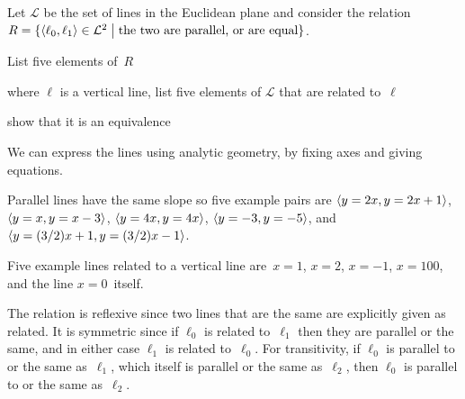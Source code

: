 \documentclass{ibl}  %
\begin{document}
\begin{problem}[\midlength] 
\label{PlaneLinesAsClasses}
Let $\mathcal{L}$ be the set of lines in the Euclidean plane and consider
the relation
$R=\{\langle\ell_0,\ell_1\rangle\in \mathcal{L}^2 \bigm| \text{the two are parallel, or are equal}\}$.
\begin{items}
\item List five elements of~$R$ 
\item where $\ell$ is a vertical line, 
  list five elements of $\mathcal{L}$ that are related to~$\ell$
\item show that it is an equivalence
\end{items}
\begin{answer}
We can express the lines using analytic geometry, by
fixing axes and giving equations.
\begin{items}
\item Parallel lines have the same slope so
  five example pairs are $\langle y=2x,y=2x+1\rangle$, 
  $\langle y=x,y=x-3\rangle$, 
  $\langle y=4x,y=4x\rangle$,
  $\langle y=-3,y=-5\rangle$, 
  and~$\langle y=(3/2)x+1,y=(3/2)x-1\rangle$.    
\item   
  Five example lines related to a vertical line are~$x=1$, $x=2$, 
  $x=-1$, $x=100$, 
  and the line $x=0$~itself.
\item The relation is reflexive since two lines that are the same are
  explicitly given as related.
  It is symmetric since if $\ell_0$ is related to~$\ell_1$
  then they are parallel or the same, and in either case
  $\ell_1$ is related to~$\ell_0$.
  For transitivity, if $\ell_0$ is parallel to or the same as~$\ell_1$, 
  which itself is parallel or the same as~$\ell_2$, then $\ell_0$
  is parallel to or the same as~$\ell_2$. 
\end{items}
\end{answer}
\end{problem}
\end{document}
